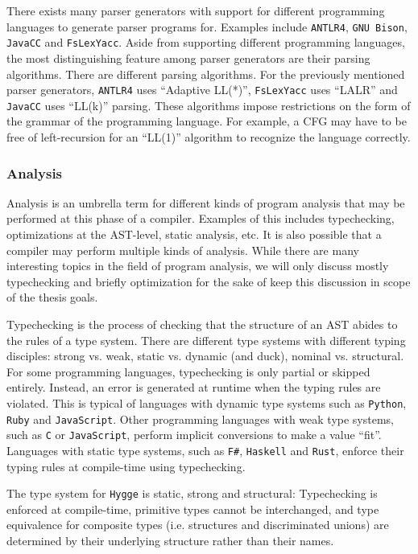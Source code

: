 There exists many parser generators with support for different programming languages to generate parser programs for. Examples include \texttt{ANTLR4}\cite{antlr4}, \texttt{GNU Bison}\cite{gnu_bison},
\texttt{JavaCC}\cite{javacc} and \texttt{FsLexYacc}\cite{fslexyacc}. Aside from supporting different programming languages, the most distinguishing feature among parser generators are their parsing algorithms.
There are different parsing algorithms. For the previously mentioned parser generators, \texttt{ANTLR4} uses ``Adaptive LL(*)'', \texttt{FsLexYacc} uses ``LALR'' and \texttt{JavaCC}
uses ``LL(k)'' parsing. These algorithms impose restrictions on the form of the grammar of the programming language. For example, a CFG may have to be free of left-recursion for an ``LL(1)'' algorithm to recognize the language correctly.

\subsubsection{Analysis}

Analysis is an umbrella term for different kinds of program analysis that may be performed at this phase of a compiler. Examples of this includes typechecking, optimizations at the AST-level,
static analysis, etc. It is also possible that a compiler may perform multiple kinds of analysis. While there are many interesting topics in the field of program analysis,
we will only discuss mostly typechecking and briefly optimization for the sake of keep this discussion in scope of the thesis goals.

Typechecking is the process of checking that the structure of an AST abides to the rules of a type system. There are different type systems with different typing disciples:
strong vs. weak, static vs. dynamic (and duck), nominal vs. structural. For some programming languages, typechecking is only partial or skipped entirely. Instead,
an error is generated at runtime when the typing rules are violated. This is typical of languages with dynamic type systems such as \texttt{Python}, \texttt{Ruby} and
\texttt{JavaScript}. Other programming languages with weak type systems, such as \texttt{C} or \texttt{JavaScript}, perform implicit conversions to make a value ``fit''.
Languages with static type systems, such as \texttt{F\#}, \texttt{Haskell} and \texttt{Rust}, enforce their typing rules at compile-time using typechecking.

The type system for \texttt{Hygge} is static, strong and structural: Typechecking is enforced at compile-time, primitive types cannot be interchanged, and type
equivalence for composite types (i.e. structures and discriminated unions) are determined by their underlying structure rather than their names. 

